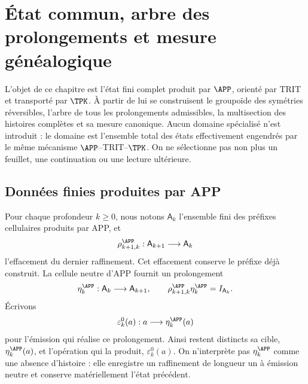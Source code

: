 \chapter{État commun, arbre des prolongements et mesure généalogique}
\label{chap:continuo-estado-arbol-medida-comun}

\begin{thesisbox}[title={Un seul état enrichi avant toute discrimination interne}]
L'objet de ce chapitre est l'état fini complet produit par \(\APP\), orienté par TRIT et transporté par \(\TPK\). À partir de lui se construisent le groupoïde des symétries réversibles, l'arbre de tous les prolongements admissibles, la multisection des histoires complètes et sa mesure canonique. Aucun domaine spécialisé n'est introduit : le domaine est l'ensemble total des états effectivement engendrés par le même mécanisme \(\APP\)--TRIT--\(\TPK\). On ne sélectionne pas non plus un feuillet, une continuation ou une lecture ultérieure.
\end{thesisbox}

\section{Données finies produites par APP}
\label{sec:continuo-comun-app-finito}

Pour chaque profondeur \(k\geq0\), nous notons \(\mathsf A_k\) l'ensemble fini des préfixes cellulaires produits par APP, et
\begin{equation}
\label{eq:continuo-comun-app-truncamiento}
 \rho^{\APP}_{k+1,k}:\mathsf A_{k+1}\longrightarrow\mathsf A_k
\end{equation}
l'effacement du dernier raffinement. Cet effacement conserve le préfixe déjà construit. La cellule neutre d'APP fournit un prolongement
\begin{equation}
\label{eq:continuo-comun-app-degeneracion}
 \eta^{\APP}_k:\mathsf A_k\longrightarrow\mathsf A_{k+1},
 \qquad
 \rho^{\APP}_{k+1,k}\eta^{\APP}_k=I_{\mathsf A_k}.
\end{equation}
Écrivons
\begin{equation}
\label{eq:continuo-comun-emision-neutra-app}
 \varepsilon^0_k(a):a\longrightarrow\eta^{\APP}_k(a)
\end{equation}
pour l'émission qui réalise ce prolongement. Ainsi restent distincts sa cible, \(\eta^{\APP}_k(a)\), et l'opération qui la produit, \(\varepsilon^0_k(a)\). On n'interprète pas \(\eta^{\APP}_k\) comme une absence d'histoire : elle enregistre un raffinement de longueur un à émission neutre et conserve matériellement l'état précédent.

